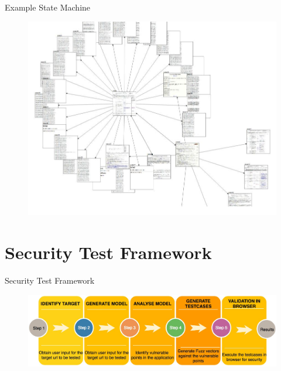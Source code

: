 \documentclass{beamer}
\begin{document}
\begin{frame}{Example State Machine}
 \begin{figure}[h]
    \centering
    \includegraphics[scale=0.4]{MTP5.png}
\end{figure}
\end{frame}



\section{Security Test Framework}
\begin{frame}{Security Test Framework}

 \begin{figure}[h]
    \centering
    \includegraphics[scale=0.2]{MTP8.jpg}
\end{figure}
\end{frame}
\end{document}
